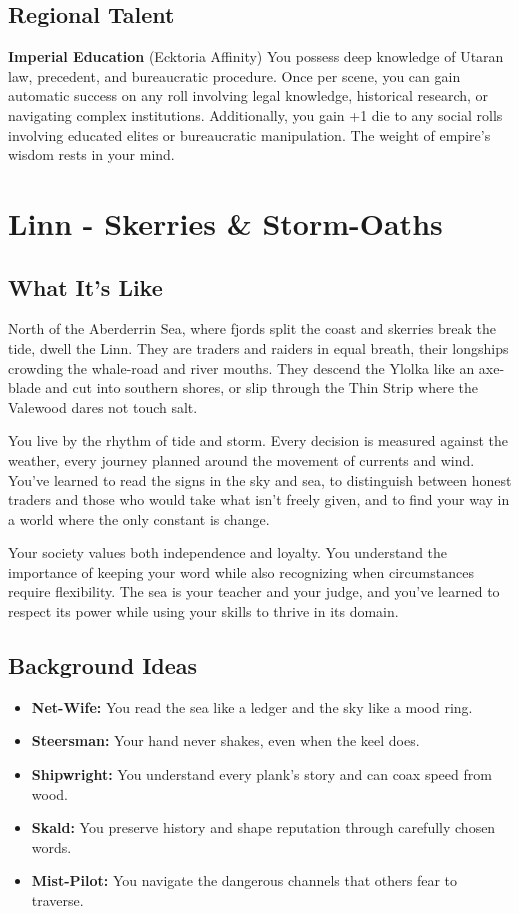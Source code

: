\documentclass[11pt]{article}
\newcommand{\region}[1]{\section*{#1}}
\newcommand{\subregion}[1]{\subsection*{#1}}
\begin{document}
\begin{multicols}{2}
\subregion{Regional Talent}

\textbf{Imperial Education} (Ecktoria Affinity)
You possess deep knowledge of Utaran law, precedent, and bureaucratic procedure. Once per scene, you can gain automatic success on any roll involving legal knowledge, historical research, or navigating complex institutions. Additionally, you gain +1 die to any social rolls involving educated elites or bureaucratic manipulation. The weight of empire's wisdom rests in your mind.

\end{multicols}

\region{Linn - Skerries \& Storm-Oaths}

\begin{multicols}{2}
\subregion{What It's Like}

North of the Aberderrin Sea, where fjords split the coast and skerries break the tide, dwell the Linn. They are traders and raiders in equal breath, their longships crowding the whale-road and river mouths. They descend the Ylolka like an axe-blade and cut into southern shores, or slip through the Thin Strip where the Valewood dares not touch salt.

You live by the rhythm of tide and storm. Every decision is measured against the weather, every journey planned around the movement of currents and wind. You've learned to read the signs in the sky and sea, to distinguish between honest traders and those who would take what isn't freely given, and to find your way in a world where the only constant is change.

Your society values both independence and loyalty. You understand the importance of keeping your word while also recognizing when circumstances require flexibility. The sea is your teacher and your judge, and you've learned to respect its power while using your skills to thrive in its domain.

\columnbreak

\subregion{Background Ideas}

\begin{itemize}[leftmargin=*]
    \item \textbf{Net-Wife:} You read the sea like a ledger and the sky like a mood ring.
    \item \textbf{Steersman:} Your hand never shakes, even when the keel does.
    \item \textbf{Shipwright:} You understand every plank's story and can coax speed from wood.
    \item \textbf{Skald:} You preserve history and shape reputation through carefully chosen words.
    \item \textbf{Mist-Pilot:} You navigate the dangerous channels that others fear to traverse.
\end{itemize}


\end{multicols}
\end{document}
